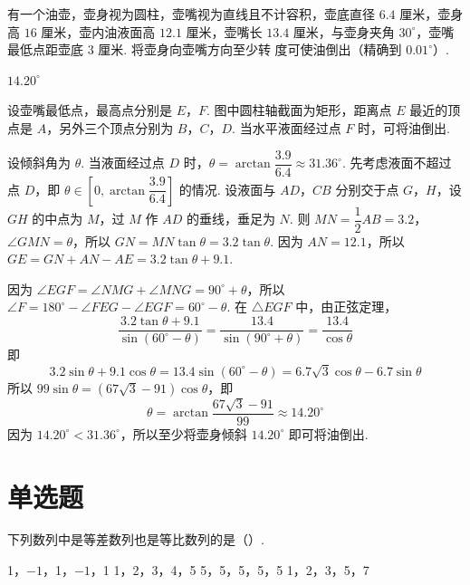\begin{problem}
有一个油壶，壶身视为圆柱，壶嘴视为直线且不计容积，壶底直径 \(6.4\text{ 厘米}\)，壶身高 \(16\text{ 厘米}\)，壶内油液面高 \(12.1\text{ 厘米}\)，壶嘴长 \(13.4\text{ 厘米}\)，与壶身夹角 \(30^\circ\)，壶嘴最低点距壶底 \(3\text{ 厘米}\). 将壶身向壶嘴方向至少转\fillinblank{}\(\text{ 度}\)可使油倒出（精确到 \(0.01^\circ\)）.

\end{problem}

\begin{answer}
\(14.20^\circ\)
\end{answer}

\begin{solution}

设壶嘴最低点，最高点分别是 \(E\)，\(F\). 图中圆柱轴截面为矩形，距离点 \(E\) 最近的顶点是 \(A\)，另外三个顶点分别为 \(B\)，\(C\)，\(D\). 当水平液面经过点 \(F\) 时，可将油倒出.

设倾斜角为 \(\theta\). 当液面经过点 \(D\) 时，\(\theta=\arctan\dfrac{3.9}{6.4}\approx31.36^\circ\). 先考虑液面不超过点 \(D\)，即 \(\theta\in\left[0,\arctan\dfrac{3.9}{6.4}\right]\) 的情况. 设液面与 \(AD\)，\(CB\) 分别交于点 \(G\)，\(H\)，设 \(GH\) 的中点为 \(M\)，过 \(M\) 作 \(AD\) 的垂线，垂足为 \(N\). 则 \(MN=\dfrac12AB=3.2\)，\(\angle GMN=\theta\)，所以 \(GN=MN\tan\theta=3.2\tan\theta\). 因为 \(AN=12.1\)，所以 \(GE=GN+AN-AE=3.2\tan\theta+9.1\).

因为 \(\angle EGF=\angle NMG+\angle MNG=90^\circ+\theta\)，所以 \(\angle F=180^\circ-\angle FEG-\angle EGF=60^\circ-\theta\). 在 \(\triangle EGF\) 中，由正弦定理，
\[
\frac{3.2\tan\theta+9.1}{\sin(60^\circ-\theta)}
=\frac{13.4}{\sin(90^\circ+\theta)}
=\frac{13.4}{\cos\theta}
\]
即
\[
3.2\sin\theta+9.1\cos\theta
=13.4\sin(60^\circ-\theta)
=6.7\sqrt3\cos\theta-6.7\sin\theta
\]
所以 \(99\sin\theta=(67\sqrt3-91)\cos\theta\)，即
\[
\theta=\arctan\frac{67\sqrt3-91}{99}\approx14.20^\circ
\]
因为 \(14.20^\circ<31.36^\circ\)，所以至少将壶身倾斜 \(14.20^\circ\) 即可将油倒出.
\end{solution}

\section{单选题}

\begin{problem}
下列数列中是等差数列也是等比数列的是（\quad）.

\choices
    {1，\(-1\)，1，\(-1\)，1}
    {1，2，3，4，5}
    {5，5，5，5，5}
    {1，2，3，5，7}
\end{problem}

